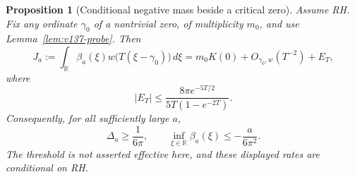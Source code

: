 \documentclass[11pt]{article}
\newtheorem{proposition}[theorem]{Proposition}
\theoremstyle{remark}
\begin{document}
\begin{proposition}[Conditional negative mass beside a critical zero]
\label{prop:v137-conditional-mass}
Assume RH. Fix any ordinate $\gamma_0$ of a nontrivial zero, of
multiplicity $m_0$, and use Lemma~\ref{lem:v137-probe}. Then
\begin{equation}\label{eq:v137-probe-limit}
 J_a:=\int_{\mathbb R}\beta_a(\xi)
              w\bigl(T(\xi-\gamma_0)\bigr)\,d\xi
 =m_0K(0)+O_{\gamma_0,w}(T^{-2})+E_T,
\end{equation}
where
\begin{equation}\label{eq:v137-exterior-error}
 |E_T|\le\frac{8\pi e^{-5T/2}}{5T(1-e^{-2T})}.
\end{equation}
Consequently, for all sufficiently large $a$,
\begin{equation}\label{eq:v137-conditional-lower}
 \Delta_a\ge\frac1{6\pi},\qquad
 \inf_{\xi\in\mathbb R}\beta_a(\xi)
      \le-\frac{a}{6\pi^2}.
\end{equation}
The threshold is not asserted effective here, and these displayed rates
are conditional on RH.
\end{proposition}
\end{document}
